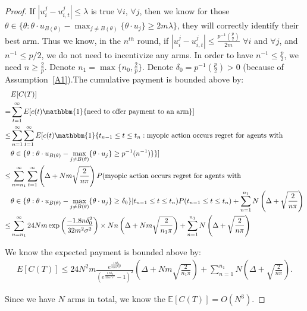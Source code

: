 \documentclass{article}
\begin{document}
\begin{proof}
If $|u_{i}^{j}-u_{i,t}^{j}|\leq \lambda$ is true $\forall i$, $\forall j$, then we know for those $\theta\in \{\theta:\theta\cdot u_{B(\theta)}-\max_{j\neq B(\theta)}\{\theta \cdot u_{j}\}\geq 2m\lambda\}$, they will correctly identify their best arm. Thus we know, in the $n^{th}$ round, if $|u_{i}^{j}-u_{i,t}^{j}|\leq \frac{p^{-1}(\frac{p}{2})}{2m}$ $\forall i$ and $\forall j$, and $n^{-1}\leq p/2$, we do not need to incentivize any arms. In order to have $n^{-1}\leq \frac{p}{2}$, we need $n\geq \frac{2}{p}$. Denote $n_1=\max\{n_{0}, \frac{2}{p}\}$. Denote $\delta_{0}=p^{-1}(\frac{p}{2})>0$ (because of Assumption~\ref{A1}).The cumulative payment is bounded above by:
\begin{align}
&E[C(T)] \nonumber \\
= & \sum_{t=1}^{\infty}E[c(t)\mathbbm{1}\{\text{need to offer payment to an arm}\}] \nonumber \\
\leq &\sum_{n=1}^{\infty}\sum_{t=1}^{\infty}E[c(t)\mathbbm{1}\{t_{n-1}\leq t\leq t_{n}: \text{myopic action occurs regret for agents with } \nonumber \\
&\theta\in \{\theta:\theta\cdot u_{B(\theta)}-\max_{j\neq B(\theta)}\{\theta \cdot u_{j}\}\geq p^{-1}(n^{-1})\}\}] \nonumber \\
\leq &\sum_{n=n_{1}}^{\infty}\sum_{t=1}^{\infty}\left(\Delta+Nm\sqrt{\frac{2}{n\pi}}\right)P(\text{myopic action occurs regret for agents with }\nonumber \\
&\theta\in \{\theta:\theta\cdot u_{B(\theta)}-\max_{j\neq B(\theta)}\{\theta \cdot u_{j}\}\geq \delta_{0}\}|t_{n-1}\leq t\leq t_{n})P(t_{n-1}\leq t\leq t_{n})+\sum_{n=1}^{n_1}N\left(\Delta+\sqrt{\frac{2}{n\pi}}\right) \nonumber \\
\leq & \sum_{n=n_{1}}^{\infty}24Nm \exp\left(\frac{-1.8 n\delta_{0}^2}{32m^2\sigma^2}\right)\times Nn\left(\Delta+Nm\sqrt{\frac{2}{n_1\pi}}\right)+\sum_{n=1}^{n_1}N\left(\Delta+\sqrt{\frac{2}{n\pi}}\right) \nonumber 
\end{align}

We know the expected payment is bounded above by:
\begin{align}
E[C(T)] \leq 24N^2 m \frac{e^{\frac{1.8\delta_{0}}{32m^2\sigma^2}}}{(e^{\frac{1.8\delta_{0}}{32m^2\sigma^2}}-1)^2}\left(\Delta+Nm\sqrt{\frac{2}{n_1\pi}}\right)+\sum_{n=1}^{n_1}N\left(\Delta+\sqrt{\frac{2}{n\pi}}\right). \nonumber
\end{align}

Since we have $N$ arms in total, we know the $\mathbb{E}[C(T)]=O(N^3)$.
\end{proof}
\end{document}
